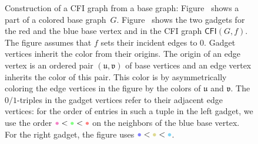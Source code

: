 \documentclass[]{lmcs}
\newcommand{\CFIsym}{\mathsf{CFI}}
\newcommand{\CFI}[1]{\CFIsym(#1)}
\newcommand{\bVertA}{\mathfrak{u}}
\newcommand{\bVertB}{\mathfrak{v}}
\begin{document}
\begin{figure}
{
		\label{fig:cfi-gadget-edge-sub-gadgets}
	}
	\caption[CFI gadgets with gadget and edge vertices]{Construction of a CFI graph from a base graph:
		Figure~\protect{} shows a part of a colored base graph~$G$.
		Figure~\protect{}
		shows the two gadgets for the red and the blue base vertex and in the CFI graph $\CFI{G,f}$.
		The figure  assumes that $f$ sets their incident edges to $0$.
		Gadget vertices inherit the color from their origins.
		The origin of an edge vertex is an ordered pair $(\bVertA,\bVertB)$ of base vertices and an edge vertex inherits the color of this pair.
		This color is  by asymmetrically coloring the edge vertices in the figure by the colors of $\bVertA$ and $\bVertB$.
		The $0/1$-triples in the gadget vertices refer to their adjacent edge vertices: for the order of entries in such a tuple in the left gadget,
		we use the order  $\textcolor{edgeColD}{\bullet} < \textcolor{edgeColC}{\bullet} < \textcolor{edgeColB}{\bullet}$
		on the neighbors of the blue base vertex.
		For the right gadget, the figure uses
		$\textcolor{edgeColA}{\bullet} < \textcolor{edgeColE}{\bullet} < \textcolor{edgeColF}{\bullet}$.
	}
	\label{fig:cfi-gadget-edge}
\end{figure}
\end{document}
